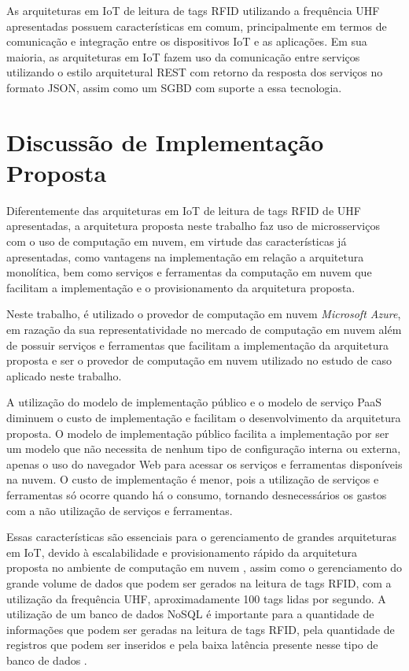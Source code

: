 As arquiteturas em \acrshort{IoT} de leitura de tags \acrshort{RFID} utilizando a frequência \acrshort{UHF} apresentadas possuem características em comum, principalmente em termos de comunicação e integração entre os dispositivos \acrshort{IoT} e as aplicações. Em sua maioria, as arquiteturas em \acrshort{IoT} fazem uso da comunicação entre serviços utilizando o estilo arquitetural \acrshort{REST} com retorno da resposta dos serviços no formato \acrshort{JSON}, assim como um \acrshort{SGBD} com suporte a essa tecnologia.

\section{Discussão de Implementação Proposta}
\label{sec:discussao}

Diferentemente das arquiteturas em \acrshort{IoT} de leitura de tags \acrshort{RFID} de \acrshort{UHF} apresentadas, a arquitetura proposta neste trabalho faz uso de microsserviços com o uso de computação em nuvem, em virtude das características já apresentadas, como vantagens na implementação em relação a arquitetura monolítica, bem como serviços e ferramentas da computação em nuvem que facilitam a implementação e o provisionamento da arquitetura proposta.

Neste trabalho, é utilizado o provedor de computação em nuvem \textit{Microsoft Azure}, em razação da sua representatividade no mercado de computação em nuvem além de possuir serviços e ferramentas que facilitam a implementação da arquitetura proposta e ser o provedor de computação em nuvem utilizado no estudo de caso aplicado neste trabalho.

A utilização do modelo de implementação público e o modelo de serviço \acrshort{PaaS} diminuem o custo de implementação e facilitam o desenvolvimento da arquitetura proposta. O modelo de implementação público facilita a implementação por ser um modelo que não necessita de nenhum tipo de configuração interna ou externa, apenas o uso do navegador Web para acessar os serviços e ferramentas disponíveis na nuvem. O custo de implementação é menor, pois a utilização de serviços e ferramentas só ocorre quando há o consumo, tornando desnecessários os gastos com a não utilização de serviços e ferramentas.

Essas características são essenciais para o gerenciamento de grandes arquiteturas em \acrlong{IoT}, devido à escalabilidade e provisionamento rápido da arquitetura proposta no ambiente de computação em nuvem \cite{Khazaei2017End-to-endApplications}, assim como o gerenciamento do grande volume de dados que podem ser gerados na leitura de tags \acrshort{RFID}, com a utilização da frequência \acrshort{UHF}, aproximadamente 100 tags lidas por segundo. A utilização de um banco de dados \acrshort{NoSQL} é importante para a quantidade de informações que podem ser geradas na leitura de tags \acrshort{RFID}, pela quantidade de registros que podem ser inseridos e pela baixa latência presente nesse tipo de banco de dados \cite{Dias2018NoSQLStudy}.

